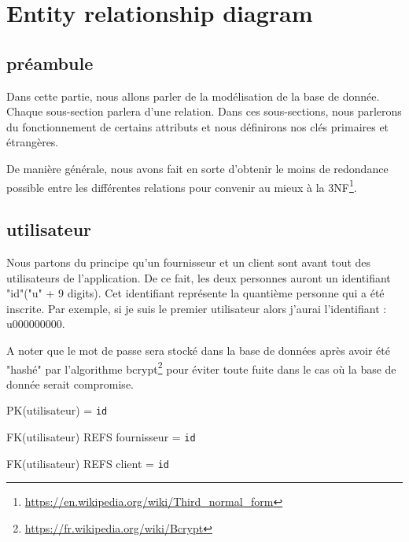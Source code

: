 \section{Entity relationship diagram}
\subsection{préambule}
\begin{flushleft}
Dans cette partie, nous allons parler de la modélisation de la base de donnée. Chaque sous-section parlera d'une relation. Dans ces sous-sections, nous parlerons du fonctionnement de certains attributs et nous définirons nos clés primaires et étrangères.
\end{flushleft}

\begin{flushleft}
De manière générale, nous avons fait en sorte d'obtenir le moins de redondance possible entre les différentes relations pour convenir au mieux à la 3NF\footnote{ \url{https://en.wikipedia.org/wiki/Third\_normal\_form}}.
\end{flushleft}
\subsection{utilisateur}
\begin{flushleft}
Nous partons du principe qu'un fournisseur et un client sont avant tout des utilisateurs de l'application. De ce fait, les deux personnes auront un identifiant "id"("u" + 9 digits). Cet identifiant représente la quantième personne qui a été inscrite. Par exemple, si je suis le premier utilisateur alors j'aurai l'identifiant : u000000000.
\end{flushleft}

\begin{flushleft}
A noter que le mot de passe sera stocké dans la base de données après avoir été "hashé" par l'algorithme bcrypt\footnote{\url{https://fr.wikipedia.org/wiki/Bcrypt}} pour éviter toute fuite dans le cas où la base de donnée serait compromise.
\end{flushleft}

\begin{flushleft}
PK(utilisateur) = \texttt{id}
\end{flushleft}

\begin{flushleft}
FK(utilisateur) REFS fournisseur = \texttt{id}

FK(utilisateur) REFS client = \texttt{id}
\end{flushleft}
\newpage
